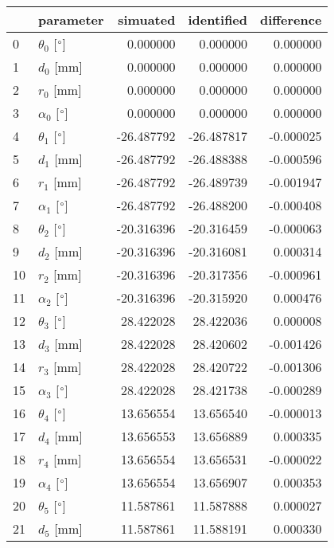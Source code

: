 \documentclass{standalone}%
\begin{document}
%
\normalsize%
\begin{tabular}{llrrr}
\toprule
{} &                 parameter &   simuated & identified & difference \\
\midrule
0  &  $\theta_{0}$ [$\degree$] &   0.000000 &   0.000000 &   0.000000 \\
1  &              $d_{0}$ [mm] &   0.000000 &   0.000000 &   0.000000 \\
2  &              $r_{0}$ [mm] &   0.000000 &   0.000000 &   0.000000 \\
3  &  $\alpha_{0}$ [$\degree$] &   0.000000 &   0.000000 &   0.000000 \\
4  &  $\theta_{1}$ [$\degree$] & -26.487792 & -26.487817 &  -0.000025 \\
5  &              $d_{1}$ [mm] & -26.487792 & -26.488388 &  -0.000596 \\
6  &              $r_{1}$ [mm] & -26.487792 & -26.489739 &  -0.001947 \\
7  &  $\alpha_{1}$ [$\degree$] & -26.487792 & -26.488200 &  -0.000408 \\
8  &  $\theta_{2}$ [$\degree$] & -20.316396 & -20.316459 &  -0.000063 \\
9  &              $d_{2}$ [mm] & -20.316396 & -20.316081 &   0.000314 \\
10 &              $r_{2}$ [mm] & -20.316396 & -20.317356 &  -0.000961 \\
11 &  $\alpha_{2}$ [$\degree$] & -20.316396 & -20.315920 &   0.000476 \\
12 &  $\theta_{3}$ [$\degree$] &  28.422028 &  28.422036 &   0.000008 \\
13 &              $d_{3}$ [mm] &  28.422028 &  28.420602 &  -0.001426 \\
14 &              $r_{3}$ [mm] &  28.422028 &  28.420722 &  -0.001306 \\
15 &  $\alpha_{3}$ [$\degree$] &  28.422028 &  28.421738 &  -0.000289 \\
16 &  $\theta_{4}$ [$\degree$] &  13.656554 &  13.656540 &  -0.000013 \\
17 &              $d_{4}$ [mm] &  13.656553 &  13.656889 &   0.000335 \\
18 &              $r_{4}$ [mm] &  13.656554 &  13.656531 &  -0.000022 \\
19 &  $\alpha_{4}$ [$\degree$] &  13.656554 &  13.656907 &   0.000353 \\
20 &  $\theta_{5}$ [$\degree$] &  11.587861 &  11.587888 &   0.000027 \\
21 &              $d_{5}$ [mm] &  11.587861 &  11.588191 &   0.000330 \\

\end{tabular}
\end{document}
